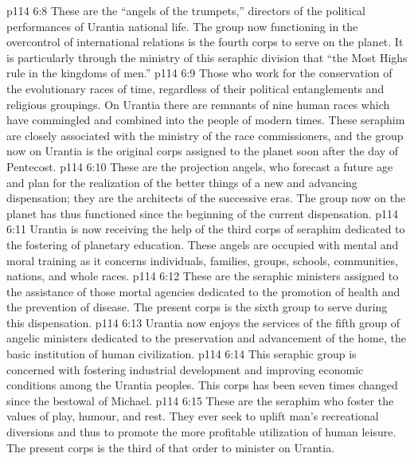 \vs p114 6:8 \bibnobreakspace {} These are the “angels of the trumpets,” directors of the political performances of Urantia national life. The group now functioning in the overcontrol of international relations is the fourth corps to serve on the planet. It is particularly through the ministry of this seraphic division that “the Most Highs rule in the kingdoms of men.”
\vs p114 6:9 \bibnobreakspace {} Those who work for the conservation of the evolutionary races of time, regardless of their political entanglements and religious groupings. On Urantia there are remnants of nine human races which have commingled and combined into the people of modern times. These seraphim are closely associated with the ministry of the race commissioners, and the group now on Urantia is the original corps assigned to the planet soon after the day of Pentecost.
\vs p114 6:10 \bibnobreakspace {} These are the projection angels, who forecast a future age and plan for the realization of the better things of a new and advancing dispensation; they are the architects of the successive eras. The group now on the planet has thus functioned since the beginning of the current dispensation.
\vs p114 6:11 \bibnobreakspace {} Urantia is now receiving the help of the third corps of seraphim dedicated to the fostering of planetary education. These angels are occupied with mental and moral training as it concerns individuals, families, groups, schools, communities, nations, and whole races.
\vs p114 6:12 \bibnobreakspace {} These are the seraphic ministers assigned to the assistance of those mortal agencies dedicated to the promotion of health and the prevention of disease. The present corps is the sixth group to serve during this dispensation.
\vs p114 6:13 \bibnobreakspace {} Urantia now enjoys the services of the fifth group of angelic ministers dedicated to the preservation and advancement of the home, the basic institution of human civilization.
\vs p114 6:14 \bibnobreakspace {} This seraphic group is concerned with fostering industrial development and improving economic conditions among the Urantia peoples. This corps has been seven times changed since the bestowal of Michael.
\vs p114 6:15 \bibnobreakspace {} These are the seraphim who foster the values of play, humour, and rest. They ever seek to uplift man’s recreational diversions and thus to promote the more profitable utilization of human leisure. The present corps is the third of that order to minister on Urantia.

